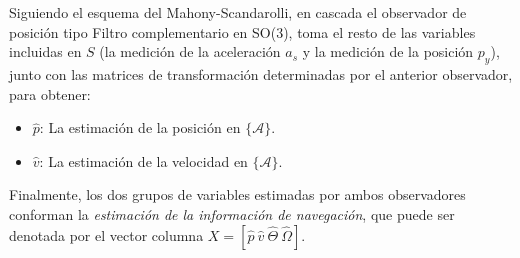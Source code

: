 \documentclass[conference]{IEEEtran}
\newcommand{\marco}[1]{\{\mathcal{#1}\}}
\begin{document}
Siguiendo el esquema del Mahony-Scandarolli, en cascada el observador de posición tipo Filtro complementario en SO(3), toma el resto de las variables incluidas en $S$ (la medición de la aceleración $a_s$ y la medición de la posición $p_y$), junto con las matrices de transformación determinadas por el anterior observador, para obtener:
\begin{itemize}
\item $\hat{p}$: La estimación de la posición en $\marco{A}$.
\item $\hat{v}$: La estimación de la velocidad en $\marco{A}$.
\end{itemize}
Finalmente, los dos grupos de variables estimadas por ambos observadores conforman la \emph{estimación de la información de navegación}, que puede ser denotada por el vector columna $X=[\hat{p}~\hat{v}~\hat{\Theta}~\hat{\Omega}]$.\par
\end{document}
